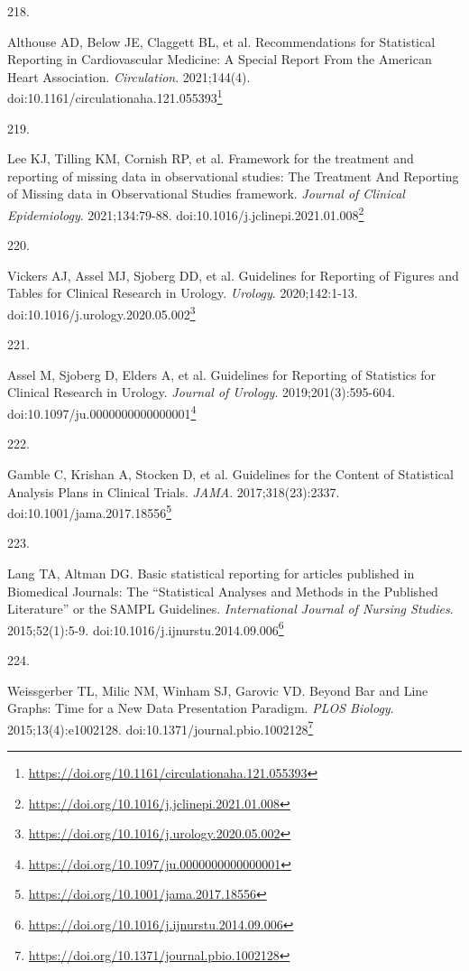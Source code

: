 \documentclass[
  a4paper,
]{book}
\newlength{\cslhangindent}
\newlength{\csllabelwidth}
\newlength{\cslentryspacingunit} %
\newenvironment{CSLReferences}[2] %
 {%
  \setlength{\parindent}{0pt}
  \ifodd #1
  \let\oldpar\par
  \def\par{\hangindent=\cslhangindent\oldpar}
  \fi
  \setlength{\parskip}{#2\cslentryspacingunit}
 }%
 {}
\newcommand{\CSLLeftMargin}[1]{\parbox[t]{\csllabelwidth}{#1}}
\newcommand{\CSLRightInline}[1]{\parbox[t]{\linewidth - \csllabelwidth}{#1}\break}
\renewcommand{\href}[2]{#2\footnote{\url{#1}}}
\begin{document}
\begin{CSLReferences}{0}{0}
\leavevmode{}%
\CSLLeftMargin{218. }%
\CSLRightInline{Althouse AD, Below JE, Claggett BL, et al. Recommendations for Statistical Reporting in Cardiovascular Medicine: A Special Report From the American Heart Association. \emph{Circulation}. 2021;144(4). doi:\href{https://doi.org/10.1161/circulationaha.121.055393}{10.1161/circulationaha.121.055393}}

\leavevmode{}%
\CSLLeftMargin{219. }%
\CSLRightInline{Lee KJ, Tilling KM, Cornish RP, et al. Framework for the treatment and reporting of missing data in observational studies: The Treatment And Reporting of Missing data in Observational Studies framework. \emph{Journal of Clinical Epidemiology}. 2021;134:79-88. doi:\href{https://doi.org/10.1016/j.jclinepi.2021.01.008}{10.1016/j.jclinepi.2021.01.008}}

\leavevmode{}%
\CSLLeftMargin{220. }%
\CSLRightInline{Vickers AJ, Assel MJ, Sjoberg DD, et al. Guidelines for Reporting of Figures and Tables for Clinical Research in Urology. \emph{Urology}. 2020;142:1-13. doi:\href{https://doi.org/10.1016/j.urology.2020.05.002}{10.1016/j.urology.2020.05.002}}

\leavevmode{}%
\CSLLeftMargin{221. }%
\CSLRightInline{Assel M, Sjoberg D, Elders A, et al. Guidelines for Reporting of Statistics for Clinical Research in Urology. \emph{Journal of Urology}. 2019;201(3):595-604. doi:\href{https://doi.org/10.1097/ju.0000000000000001}{10.1097/ju.0000000000000001}}

\leavevmode{}%
\CSLLeftMargin{222. }%
\CSLRightInline{Gamble C, Krishan A, Stocken D, et al. Guidelines for the Content of Statistical Analysis Plans in Clinical Trials. \emph{JAMA}. 2017;318(23):2337. doi:\href{https://doi.org/10.1001/jama.2017.18556}{10.1001/jama.2017.18556}}

\leavevmode{}%
\CSLLeftMargin{223. }%
\CSLRightInline{Lang TA, Altman DG. Basic statistical reporting for articles published in Biomedical Journals: The {``}Statistical Analyses and Methods in the Published Literature{''} or the SAMPL Guidelines. \emph{International Journal of Nursing Studies}. 2015;52(1):5-9. doi:\href{https://doi.org/10.1016/j.ijnurstu.2014.09.006}{10.1016/j.ijnurstu.2014.09.006}}

\leavevmode{}%
\CSLLeftMargin{224. }%
\CSLRightInline{Weissgerber TL, Milic NM, Winham SJ, Garovic VD. Beyond Bar and Line Graphs: Time for a New Data Presentation Paradigm. \emph{PLOS Biology}. 2015;13(4):e1002128. doi:\href{https://doi.org/10.1371/journal.pbio.1002128}{10.1371/journal.pbio.1002128}}


\end{CSLReferences}
\end{document}
